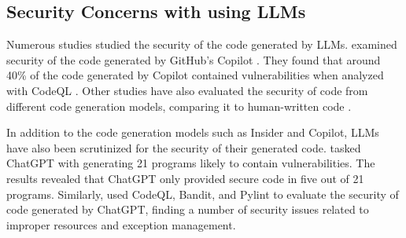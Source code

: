 \subsection{Security Concerns with using LLMs} 
\label{concerns_with_llms_in_se}
Numerous studies studied the security of the code generated by LLMs. %
\cite{pearce2022asleep} examined security of the code generated by GitHub's Copilot \citep{githubcopilot}. They found that around 40\% of the code generated by Copilot contained vulnerabilities when analyzed with CodeQL \citep{GitHubCodeQL}. Other studies have also evaluated the security of code from different code generation models, comparing it to human-written code \citep{siddiq2022securityeval, asare2023github}. %

In addition to the code generation models such as Insider and Copilot, LLMs have also been scrutinized for the security of their generated code. \cite{khoury2023secure} tasked ChatGPT with generating 21 programs likely to contain vulnerabilities. The results revealed that ChatGPT only provided secure code in five out of 21 programs. %
Similarly, \cite{siddiq2024quality} used CodeQL, Bandit, and Pylint to evaluate the security of code generated by ChatGPT, finding a number of security issues related to improper resources and exception management.

